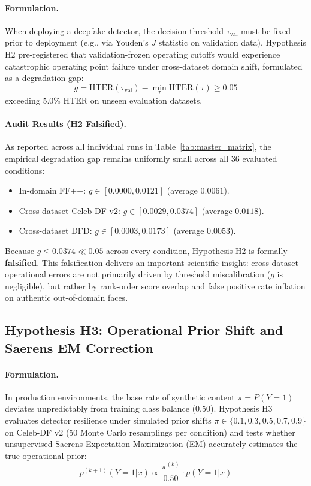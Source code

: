 \paragraph{Formulation.}
When deploying a deepfake detector, the decision threshold $\tau_{\text{val}}$ must be fixed prior to deployment (e.g., via Youden's $J$ statistic on validation data). Hypothesis H2 pre-registered that validation-frozen operating cutoffs would experience catastrophic operating point failure under cross-dataset domain shift, formulated as a degradation gap:
\begin{equation}
g = \text{HTER}(\tau_{\text{val}}) - \min_{\tau} \text{HTER}(\tau) \ge 0.05
\end{equation}
exceeding 5.0\% HTER on unseen evaluation datasets.

\paragraph{Audit Results (H2 Falsified).}
As reported across all individual runs in Table~\ref{tab:master_matrix}, the empirical degradation gap remains uniformly small across all 36 evaluated conditions:
\begin{itemize}[leftmargin=*]
    \item In-domain FF++: $g \in [0.0000, 0.0121]$ (average $0.0061$).
    \item Cross-dataset Celeb-DF v2: $g \in [0.0029, 0.0374]$ (average $0.0118$).
    \item Cross-dataset DFD: $g \in [0.0003, 0.0173]$ (average $0.0053$).
\end{itemize}
Because $g \le 0.0374 \ll 0.05$ across every condition, Hypothesis H2 is formally \textbf{falsified}. This falsification delivers an important scientific insight: cross-dataset operational errors are not primarily driven by threshold miscalibration ($g$ is negligible), but rather by rank-order score overlap and false positive rate inflation on authentic out-of-domain faces.

\subsection{Hypothesis H3: Operational Prior Shift and Saerens EM Correction}
\paragraph{Formulation.}
In production environments, the base rate of synthetic content $\pi = P(Y=1)$ deviates unpredictably from training class balance ($0.50$). Hypothesis H3 evaluates detector resilience under simulated prior shifts $\pi \in \{0.1, 0.3, 0.5, 0.7, 0.9\}$ on Celeb-DF v2 (50 Monte Carlo resamplings per condition) and tests whether unsupervised Saerens Expectation-Maximization (EM) \citep{saerens2002adjusting} accurately estimates the true operational prior:
\begin{equation}
p^{(k+1)}(Y=1|x) \propto \frac{\pi^{(k)}}{0.50} \cdot p(Y=1|x)
\end{equation}

